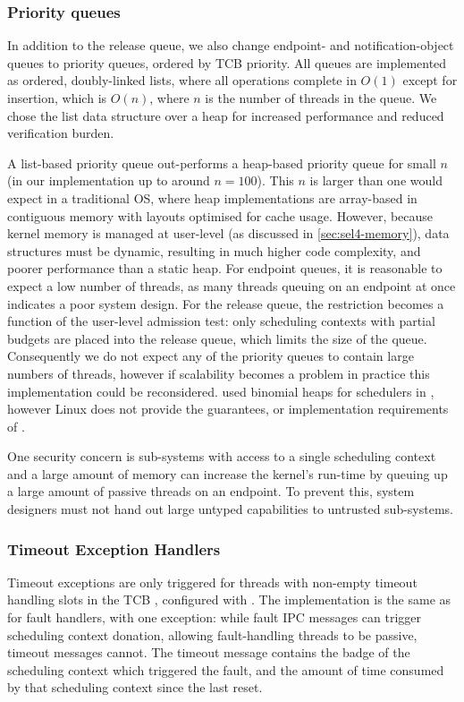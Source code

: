 \subsubsection{Priority queues}

In addition to the release queue, we also change endpoint- and notification-object queues
to priority queues, ordered by \gls{TCB} priority. All queues are implemented as ordered, doubly-linked
lists, where all operations complete in $O(1)$ except for insertion, which is $O(n)$, where $n$ 
is the number of threads in the queue. 
We chose the list data structure over a heap for increased performance and reduced verification
burden.

A list-based priority queue out-performs a heap-based priority queue for small $n$ (in our
implementation up to around $n = 100$).  This $n$ is larger than one would expect in a traditional
\gls{OS}, where heap implementations are array-based in contiguous memory with layouts optimised for
cache usage.  However, because \selfour kernel memory is
managed at user-level (as discussed in \cref{sec:sel4-memory}), data structures must be dynamic, 
resulting in much higher code complexity, and poorer performance than a static heap. 
For endpoint queues, it is reasonable to expect a low number of threads, as many threads queuing on
an endpoint at once indicates a poor system design. For the release queue, the restriction
becomes a function of the user-level admission test: only scheduling contexts with 
partial budgets are placed into the release queue, which limits the size of the queue.
Consequently we do not expect any of the priority queues to contain large numbers of threads,
however if scalability becomes a problem in
practice this implementation could be reconsidered. \citet{Brandenburg:phd} used
binomial heaps for schedulers in \litmus, however Linux does not provide the guarantees, or
implementation requirements of \selfour.

One security concern is sub-systems with access to a single scheduling context and a large amount
of memory can increase the kernel's run-time by queuing up a large amount of passive threads on 
an endpoint. To prevent this, system designers must not hand out large untyped capabilities to
untrusted sub-systems. 

\subsubsection{Timeout Exception Handlers}

Timeout exceptions are only triggered for threads with non-empty timeout handling slots in the
\gls{TCB} \cnode, configured with \tcbsettimeoutep. The implementation is the same as for
fault handlers, with one exception: while fault \gls{IPC} messages can trigger scheduling context
donation, allowing fault-handling threads to be passive, timeout messages cannot. The timeout
message contains the badge of the scheduling context which triggered the fault, and the amount of
time consumed by that scheduling context since the last reset.

